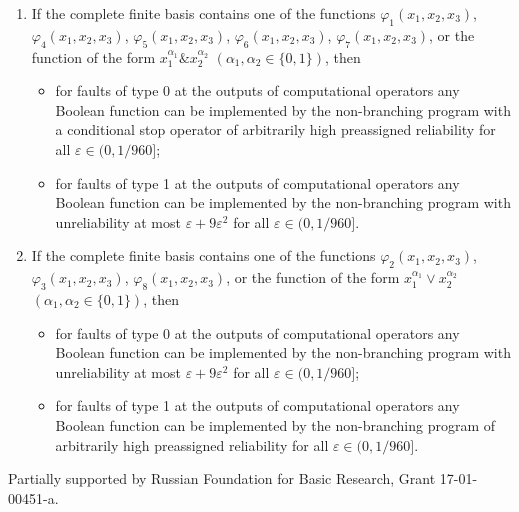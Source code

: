 \documentclass[
11pt,%
tightenlines,%
twoside,%
onecolumn,%
nofloats,%
nobibnotes,%
nofootinbib,%
superscriptaddress,%
noshowpacs,%
centertags]%
{revtex4}
\begin{document}
\begin{enumerate}
\item If the complete finite basis contains one of
the functions $\varphi_1(x_1, x_2, x_3)$, $\varphi_4(x_1, x_2, x_3)$, $\varphi_5(x_1, x_2, x_3)$, $\varphi_6(x_1, x_2, x_3)$, $\varphi_7(x_1, x_2, x_3)$, or the function of the form $x_1^{\alpha_1}\& x_2^{\alpha_2}$ \linebreak $(\alpha_1, \alpha_2\in\{0, 1\})$, then
\begin{itemize}
  \item for faults of type 0 at the outputs of computational operators any Boolean function can be implemented by the non-branching program with a conditional stop operator of arbitrarily high preassigned reliability for all $\varepsilon\in(0, 1/960]$;
  \item for faults of type 1 at the outputs of computational operators any Boolean function can be implemented by the non-branching program with unreliability at most $\varepsilon+9\varepsilon^2$ \linebreak for all $\varepsilon\in(0, 1/960]$.
\end{itemize}

\item If the complete finite basis contains one of the functions $\varphi_2(x_1, x_2, x_3)$, $\varphi_3(x_1, x_2, x_3)$, $\varphi_8(x_1, x_2, x_3)$, or the function of the form $x_1^{\alpha_1}\vee x_2^{\alpha_2}$ $(\alpha_1, \alpha_2\in\{0, 1\})$, then
\begin{itemize}
  \item for faults of type 0 at the outputs of computational operators any Boolean function can be implemented by the non-branching program with unreliability at most $\varepsilon+9\varepsilon^2$ \linebreak for all $\varepsilon\in(0, 1/960]$;
  \item for faults of type 1 at the outputs of computational operators any Boolean function can be implemented by the non-branching program of arbitrarily high preassigned reliability for all $\varepsilon\in(0, 1/960]$.
\end{itemize}
\end{enumerate}

\begin{acknowledgments}
Partially supported by Russian Foundation for Basic Research, Grant
17-01-00451-a.
\end{acknowledgments}


%
%
\end{document}
